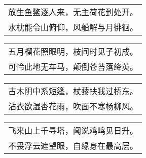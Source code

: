 \noindent\begin{minipage}{\linewidth}
  \vskip-3pt\begin{table}[H]
    \centering
    \begin{tabular}{@{}l@{}}
放生鱼鳖逐人来，无主荷花到处开。\\
水枕能令山俯仰，风船解与月徘徊。
    \end{tabular}
  \end{table}
\end{minipage}
\vspace{1cm}


\noindent\begin{minipage}{\linewidth}
  \vskip-3pt\begin{table}[H]
    \centering
    \begin{tabular}{@{}l@{}}
五月榴花照眼明，枝间时见子初成。\\
可怜此地无车马，颠倒苍苔落绛英。
    \end{tabular}
  \end{table}
\end{minipage}
\vspace{1cm}


\noindent\begin{minipage}{\linewidth}
  \vskip-3pt\begin{table}[H]
    \centering
    \begin{tabular}{@{}l@{}}
古木阴中系短篷，杖藜扶我过桥东。\\
沾衣欲湿杏花雨，吹面不寒杨柳风。
    \end{tabular}
  \end{table}
\end{minipage}
\vspace{1cm}


\noindent\begin{minipage}{\linewidth}
  \vskip-3pt\begin{table}[H]
    \centering
    \begin{tabular}{@{}l@{}}
飞来山上千寻塔，闻说鸡鸣见日升。\\
不畏浮云遮望眼，自缘身在最高层。
    \end{tabular}
  \end{table}
\end{minipage}
\vspace{1cm}


